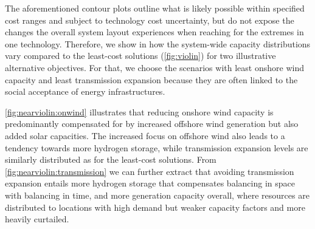 
The aforementioned contour plots 
outline what is likely possible within specified cost ranges and subject to
technology cost uncertainty, but do not expose the changes the overall system
layout experiences when reaching for the extremes in one technology. Therefore,
we show in  how
the system-wide capacity distributions vary compared to the least-cost solutions
(\cref{fig:violin}) for two illustrative alternative objectives. For that, we
choose the scenarios with least onshore wind capacity and least transmission
expansion because they are often linked to the social acceptance of energy
infrastructures.

\cref{fig:nearviolin:onwind} illustrates that reducing onshore wind capacity is
predominantly compensated for by increased offshore wind generation but also
added solar capacities. The increased focus on offshore wind also leads to a
tendency towards more hydrogen storage, while transmission expansion levels are
similarly distributed as for the least-cost solutions. From
\cref{fig:nearviolin:transmission} we can further extract that avoiding
transmission expansion entails more hydrogen storage that compensates balancing
in space with balancing in time, and more generation capacity overall, where
resources are distributed to locations with high demand but weaker capacity
factors and more heavily curtailed.
